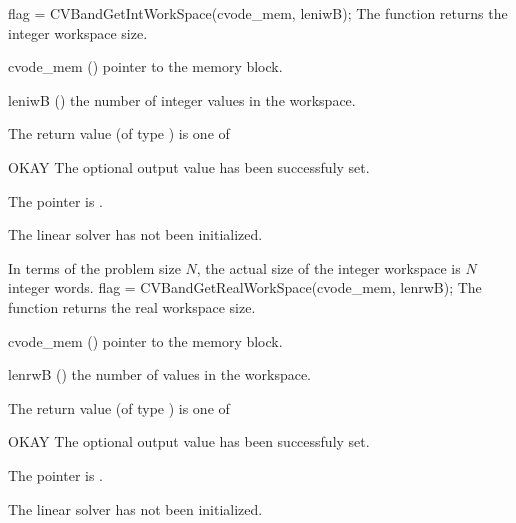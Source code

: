 %
%
{
  flag = CVBandGetIntWorkSpace(cvode\_mem, leniwB);
}
{
  The function  returns the
  {\cvband} integer workspace size.
}
{
  \begin{args}
  \item[cvode\_mem] ()
    pointer to the {\cvode} memory block.
  \item[leniwB] ()
    the number of integer values in the {\cvband} workspace.
  \end{args}
}
{
  The return value  (of type ) is one of
  \begin{args}
  \item[OKAY] 
    The optional output value has been successfuly set.
  \item[\Id{LIN\_NO\_MEM}]
    The  pointer is .
  \item[\Id{LIN\_NO\_LMEM}]
    The {\cvband} linear solver has not been initialized.
  \end{args}
}
{
  In terms of the problem size $N$, the actual size of the integer workspace
  is $N$ integer words.
}
{
  flag = CVBandGetRealWorkSpace(cvode\_mem, lenrwB);
}
{
  The function  returns the
  {\cvband} real workspace size.
}
{
  \begin{args}
  \item[cvode\_mem] ()
    pointer to the {\cvode} memory block.
  \item[lenrwB] ()
    the number of  values in the {\cvband} workspace.
  \end{args}
}
{
  The return value  (of type ) is one of
  \begin{args}
  \item[OKAY] 
    The optional output value has been successfuly set.
  \item[\Id{LIN\_NO\_MEM}]
    The  pointer is .
  \item[\Id{LIN\_NO\_LMEM}]
    The {\cvband} linear solver has not been initialized.
  \end{args}
}

